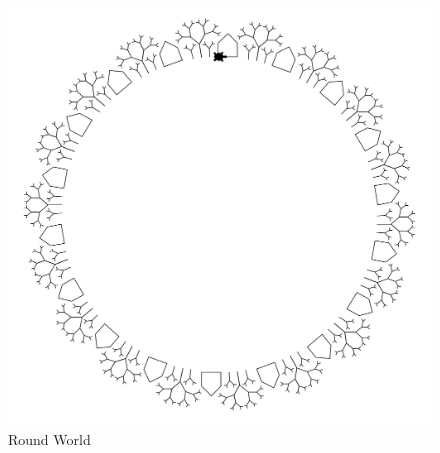 \begin{figure}[h]
	\includegraphics[width=\textwidth]{round_world}
	\caption{Round World}
	\label{fig:world:round}
\end{figure}



